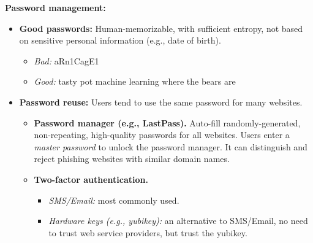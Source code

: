 \documentclass{article}
\newcommand{\parhead}[1]{\noindent \textbf{#1}}
\begin{document}

\parhead{Password management:} 
\begin{itemize}
    \item \textbf{Good passwords:} Human-memorizable, with sufficient entropy, not based on sensitive personal information (e.g., date of birth).
    \begin{itemize}
        \item \emph{Bad:} aRn1CagE1
        \item \emph{Good:} tasty pot machine learning where the bears are
    \end{itemize}
    
    \item \textbf{Password reuse:} Users tend to use the same password for many websites.
    \begin{itemize}
        \item \textbf{Password manager (e.g., LastPass).} Auto-fill randomly-generated, non-repeating, high-quality passwords for all websites. Users enter a \emph{master password} to unlock the password manager. It can distinguish and reject phishing websites with similar domain names.
        
        \item \textbf{Two-factor authentication.}
        \begin{itemize}
            \item \emph{SMS/Email:} most commonly used.
            
            \item \emph{Hardware keys (e.g., yubikey):} an alternative to SMS/Email, no need to trust web service providers, but trust the yubikey. 
        \end{itemize}
    \end{itemize}
\end{itemize}
\end{document}
